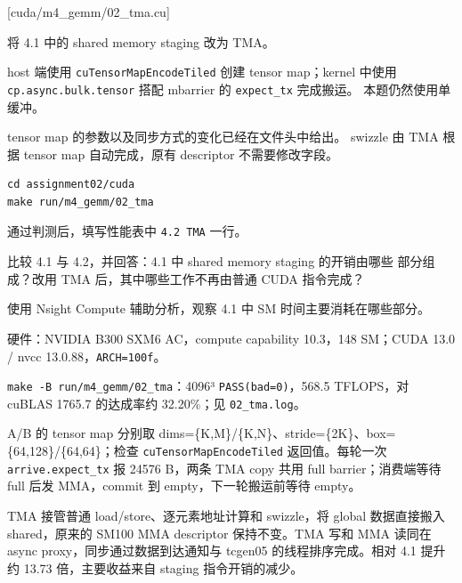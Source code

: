 \documentclass[11pt,a4paper,fontset=fandol]{ctexart}
\begin{document}
[cuda/m4\_gemm/02\_tma.cu]

将 4.1 中的 shared memory staging 改为 TMA。

host 端使用 \texttt{cuTensorMapEncodeTiled} 创建 tensor map；kernel
中使用
\texttt{cp.\allowbreak{}async.\allowbreak{}bulk.\allowbreak{}tensor}
搭配 mbarrier 的 \texttt{expect\_\allowbreak{}tx} 完成搬运。
本题仍然使用单缓冲。

tensor map 的参数以及同步方式的变化已经在文件头中给出。 swizzle 由 TMA
根据 tensor map 自动完成，原有 descriptor 不需要修改字段。

\begin{verbatim}
cd assignment02/cuda
make run/m4_gemm/02_tma
\end{verbatim}

通过判测后，填写性能表中 \texttt{4.\allowbreak{}2\ TMA} 一行。

比较 4.1 与 4.2，并回答：4.1 中 shared memory staging 的开销由哪些
部分组成？改用 TMA 后，其中哪些工作不再由普通 CUDA 指令完成？

使用 Nsight Compute 辅助分析，观察 4.1 中 SM 时间主要消耗在哪些部分。

\begin{answer}

硬件：NVIDIA B300 SXM6 AC，compute capability 10.3，148 SM；CUDA 13.0 /
nvcc 13.0.88，\texttt{ARCH=\allowbreak{}100f}。

\texttt{make\ -\allowbreak{}B\ run/\allowbreak{}m4\_\allowbreak{}gemm/\allowbreak{}02\_\allowbreak{}tma}：4096³
\texttt{PASS(bad=\allowbreak{}0)}，568.5 TFLOPS，对 cuBLAS 1765.7
的达成率约 32.20\%；见 \texttt{02\_\allowbreak{}tma.\allowbreak{}log}。

A/B 的 tensor map 分别取
dims=\{K,M\}/\{K,N\}、stride=\{2K\}、box=\{64,128\}/\{64,64\}；检查
\texttt{cuTensorMapEncodeTiled} 返回值。每轮一次
\texttt{arrive.\allowbreak{}expect\_\allowbreak{}tx} 报 24576 B，两条
TMA copy 共用 full barrier；消费端等待 full 后发 MMA，commit 到
empty，下一轮搬运前等待 empty。

TMA 接管普通 load/store、逐元素地址计算和 swizzle，将 global
数据直接搬入 shared，原来的 SM100 MMA descriptor 保持不变。TMA 写和 MMA
读同在 async proxy，同步通过数据到达通知与 tcgen05 的线程排序完成。相对
4.1 提升约 13.73 倍，主要收益来自 staging 指令开销的减少。

\end{answer}
\end{document}
